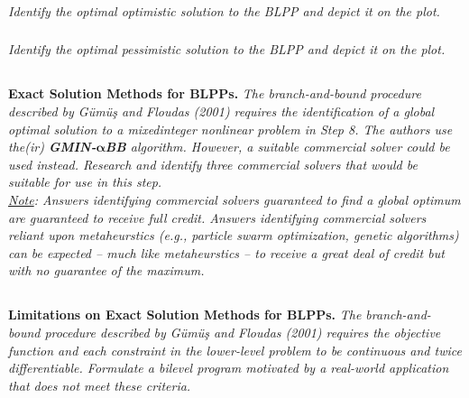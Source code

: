 \documentclass[12pt]{amsart}
\begin{document}
\subsubsection{}
\textit{Identify the optimal optimistic solution to the BLPP and depict it on the plot.}

\subsubsection{}
\textit{Identify the optimal pessimistic solution to the BLPP and depict it on the plot.}



\subsection{}
\textbf{Exact Solution Methods for BLPPs.} 
\textit{The branch-and-bound procedure described by Gümüş and Floudas (2001) requires the identification of a global optimal solution to a mixedinteger nonlinear problem in Step 8. The authors use the(ir) \textbf{GMIN-}$\mathbf\alpha$\textbf{BB} algorithm. However, a suitable commercial solver could be used instead. Research and identify three commercial solvers that would be suitable for use in this step.} \\

\textit{\underline{Note}: Answers identifying commercial solvers guaranteed to find a global optimum are guaranteed to receive full credit. Answers identifying commercial solvers reliant upon metaheurstics (e.g., particle swarm optimization, genetic algorithms) can be expected -- much like metaheurstics -- to receive a great deal of credit but with no guarantee of the
maximum.}



\subsection{}
\textbf{Limitations on Exact Solution Methods for BLPPs.} 
\textit{The branch-and-bound procedure described by Gümüş and Floudas (2001) requires the objective function and each constraint in the lower-level problem to be continuous and twice differentiable. Formulate a bilevel program motivated by a real-world application that does not meet these criteria.}
\end{document}
